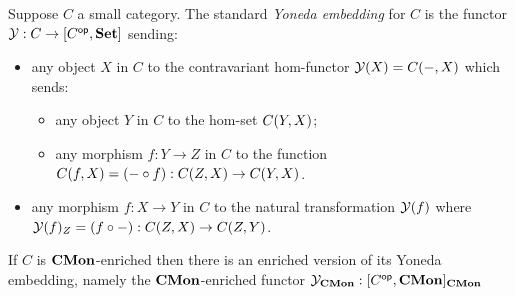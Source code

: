 Suppose $C$ a small category. The standard \emph{Yoneda embedding} for $C$ is the functor $\mathcal{Y}: C \to
[C^{\mathsf{op}},\mathbf{Set}]$ sending:
\begin{itemize}
\item any object $X$ in $C$ to the contravariant hom-functor $\mathcal{Y}(X) = {C}(-,X)$ which sends:
\begin{itemize}
\item any object $Y$ in $C$ to the hom-set ${C}(Y,X)$;
\item any morphism $f: Y \to Z$ in $C$ to the function ${C}(f,X) = (- \circ f): {C}(Z,X) \to
{C}(Y,X)$.
\end{itemize}
\item any morphism $f: X \to Y$ in $C$ to the natural transformation $\mathcal{Y}(f)$ where $\mathcal{Y}(f)_Z = (f
\circ -): {C}(Z,X) \to {C}(Z,Y)$.
\end{itemize}

If $C$ is $\mathbf{CMon}$-enriched then there is an enriched version of its Yoneda embedding, namely the
$\mathbf{CMon}$-enriched functor $\mathcal{Y}_{\mathbf{CMon}}: [C^{\mathsf{op}},\mathbf{CMon}]_{\mathbf{CMon}}$
